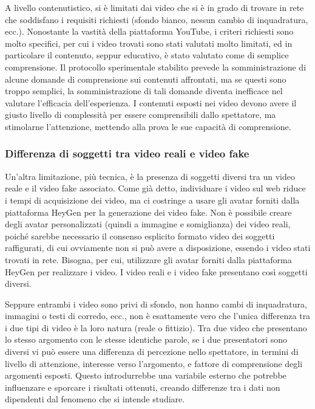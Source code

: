 A livello contenutistico, si è limitati dai video che si è in grado di trovare in rete che soddisfano i requisiti richiesti (sfondo bianco, nessun cambio di inquadratura, ecc.). Nonostante la vastità della piattaforma YouTube, i criteri richiesti sono molto specifici, per cui i video trovati sono stati valutati molto limitati, ed in particolare il contenuto, seppur educativo, è stato valutato come di semplice comprensione. Il protocollo sperimentale stabilito prevede la somministrazione di alcune domande di comprensione sui contenuti affrontati, ma se questi sono troppo semplici, la somministrazione di tali domande diventa inefficace nel valutare l'efficacia dell'esperienza. I contenuti esposti nei video devono avere il giusto livello di complessità per essere comprensibili dallo spettatore, ma stimolarne l'attenzione, mettendo alla prova le sue capacità di comprensione.

\subsubsection{Differenza di soggetti tra video reali e video fake}

Un'altra limitazione, più tecnica, è la presenza di soggetti diversi tra un video reale e il video fake associato. Come già detto, individuare i video sul web riduce i tempi di acquisizione dei video, ma ci costringe a usare gli avatar forniti dalla piattaforma HeyGen per la generazione dei video fake. Non è possibile creare degli avatar personalizzati (quindi a immagine e somiglianza) dei video reali, poiché sarebbe necessario il consenso esplicito formato video dei soggetti raffigurati, di cui ovviamente non si può avere a disposizione, essendo i video stati trovati in rete. Bisogna, per cui, utilizzare gli avatar forniti dalla piattaforma HeyGen per realizzare i video. I video reali e i video fake presentano così soggetti diversi.

Seppure entrambi i video sono privi di sfondo, non hanno cambi di inquadratura, immagini o testi di corredo, ecc., non è esattamente vero che l'unica differenza tra i due tipi di video è la loro natura (reale o fittizio). Tra due video che presentano lo stesso argomento con le stesse identiche parole, se i due presentatori sono diversi vi può essere una differenza di percezione nello spettatore, in termini di livello di attenzione, interesse verso l'argomento, e fattore di comprensione degli argomenti esposti. Questo introdurrebbe una variabile esterno che potrebbe influenzare e sporcare i risultati ottenuti, creando differenze tra i dati non dipendenti dal fenomeno che si intende studiare.

